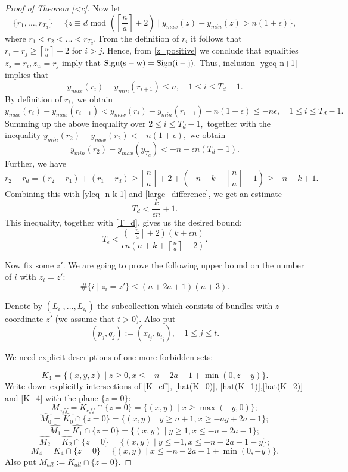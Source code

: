 \documentclass[11pt,leqno]{amsart}
\numberwithin{equation}{section}
\newcommand{\Sign}{\rm Sign}
\begin{document}
\begin{proof}[Proof of Theorem \ref{<c}]
Now let $$\{r_1,\dots,r_{T_d}\}=\{z\equiv d \text{ mod }(\left\lceil\frac{n}a\right\rceil+2)\mid y_{max}(z)-y_{min}(z)>n(1+\epsilon)\},$$
where $r_1<r_2<\dots<r_{T_d}.$ From the definition of $r_i$ it follows that $r_i-r_j\geq \left\lceil\frac{n}a\right\rceil+2$ for $i>j.$
Hence, from \eqref{z_positive} we conclude that equalities $z_s=r_i,z_w=r_j$ imply that $\Sign(s-w)=\Sign(i-j).$ Thus,
inclusion \eqref{ygeq n+1} implies that
$$y_{max}(r_{i})-y_{min}(r_{i+1})\leq n,\quad 1\leq i\leq T_d-1.$$
By definition of $r_i,$ we obtain
$$y_{max}(r_i)-y_{max}(r_{i+1})<y_{max}(r_i)-y_{min}(r_{i+1})-n(1+\epsilon)\leq -n\epsilon,\quad 1\leq i\leq T_d-1.$$
Summing up the above inequality over $2\leq i\leq T_d-1,$ together with the inequality $y_{min}(r_2)-y_{max}(r_2)<-n(1+\epsilon),$
we obtain
\begin{equation}\label{large_difference}y_{min}(r_2)-y_{max}(y_{T_d})<-n-\epsilon n(T_d-1).\end{equation}
Further, we have $$r_2-r_d=(r_2-r_1)+(r_1-r_d)\geq \left\lceil\frac{n}a\right\rceil+2+(-n-k-\left\lceil\frac{n}a\right\rceil-1)\geq -n-k+1.$$
Combining this with \eqref{yleq -n-k-1} and \eqref{large_difference}, we get an estimate
$$T_d<\frac{k}{\epsilon n}+1.$$
This inequality, together with \eqref{T_d}, gives us the desired bound:
$$T_{\epsilon}<\frac{(\left\lceil\frac{n}a\right\rceil+2)(k+\epsilon n)}{\epsilon n(n+k+\left\lceil\frac{n}a\right\rceil+2)}.$$

\smallskip

{} Now fix some $z'.$ We are going to prove the following upper bound on the number of $i$ with $z_i=z':$
\begin{equation}\label{z_fixed}\#\{i\mid z_i=z'\}\leq (n+2a+1)(n+3).\end{equation}

Denote by
$(L_{i_1},\dots,L_{i_t})$ the subcollection which consists of bundles with $z$-coordinate $z'$ (we assume that $t>0$). Also put
\begin{equation}(p_j,q_j):=(x_{i_j},y_{i_j}),\quad 1\leq j\leq t.\end{equation}

We need explicit descriptions of one more forbidden sets:

\begin{equation}\label{K_4}K_4=\{(x,y,z)\mid z\geq 0,x\leq -n-2a-1+\min(0,z-y)\}.\end{equation}
Write down explicitly intersections of \eqref{K_eff}, \eqref{hat(K_0)}, \eqref{hat(K_1)},\eqref{hat(K_2)} and \eqref{K_4} with the plane $\{z=0\}:$
$$M_{eff}=K_{eff}\cap \{z=0\}=\{(x,y)\mid x\geq \max(-y,0)\};$$
$$\widehat{M_0}=\widehat{K_0}\cap\{z=0\}=\{(x,y)\mid y\geq n+1, x\geq -ay+2a-1\};$$
$$\widehat{M_1}=\widehat{K_1}\cap\{z=0\}=\{(x,y)\mid y\geq 1, x\leq -n-2a-1\};$$
$$\widehat{M_2}=\widehat{K_2}\cap\{z=0\}=\{(x,y)\mid y\leq -1, x\leq -n-2a-1-y\};$$
$$M_4=K_4\cap\{z=0\}=\{(x,y)\mid x\leq -n-2a-1+\min(0,-y)\}.$$
Also put $M_{all}:=K_{all}\cap\{z=0\}.$


\end{proof}
\end{document}
